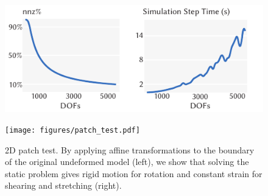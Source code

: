 \begin{figure}[h]
  \includegraphics[width=\columnwidth]{figures/scalability.pdf}
  \caption{}
  \label{fig:scalability}
\end{figure}



\begin{figure}[h]
  \texttt{[image: figures/patch\_test.pdf]}
  \caption{2D patch test. By applying affine transformations to the boundary of the original undeformed model (left), we show that solving the static problem gives rigid motion for rotation and constant strain for shearing and stretching (right).}
  \label{fig:patchtest}
\end{figure}

